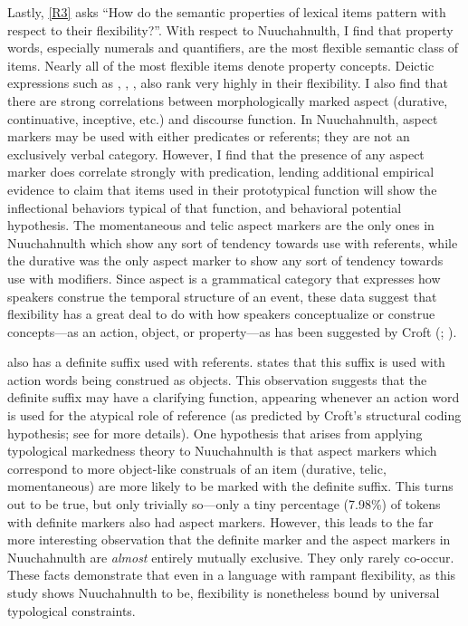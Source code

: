 Lastly, \ref{R3} asks \enquote{How do the semantic properties of lexical items pattern with respect to their flexibility?}. With respect to Nuuchahnulth, I find that property words, especially numerals and quantifiers, are the most flexible semantic class of items. Nearly all of the most flexible items denote property concepts. Deictic expressions such as , , ,  also rank very highly in their flexibility. I also find that there are strong correlations between morphologically marked aspect (durative, continuative, inceptive, etc.) and discourse function. In Nuuchahnulth, aspect markers may be used with either predicates or referents; they are not an exclusively verbal category. However, I find that the presence of any aspect marker does correlate strongly with predication, lending additional empirical evidence to  claim that items used in their prototypical function will show the inflectional behaviors typical of that function, and  behavioral potential hypothesis. The momentaneous and telic aspect markers are the only ones in Nuuchahnulth which show any sort of tendency towards use with referents, while the durative was the only aspect marker to show any sort of tendency towards use with modifiers. Since aspect is a grammatical category that expresses how speakers construe the temporal structure of an event, these data suggest that flexibility has a great deal to do with how speakers conceptualize or construe concepts—as an action, object, or property—as has been suggested by Croft (\citeyear[99]{Croft1991}; \citeyear[104]{Croft2001b}).

 also has a definite suffix  used with referents. \textcite[48]{Nakayama2001} states that this suffix is used with action words being construed as objects. This observation suggests that the definite suffix may have a clarifying function, appearing whenever an action word is used for the atypical role of reference (as predicted by Croft's structural coding hypothesis; see  for more details). One hypothesis that arises from applying typological markedness theory to Nuuchahnulth is that aspect markers which correspond to more object-like construals of an item (durative, telic, momentaneous) are more likely to be marked with the definite suffix. This turns out to be true, but only trivially so—only a tiny percentage (7.98\%) of tokens with definite markers also had aspect markers. However, this leads to the far more interesting observation that the definite marker and the aspect markers in Nuuchahnulth are \emph{almost} entirely mutually exclusive. They only rarely co-occur. These facts demonstrate that even in a language with rampant flexibility, as this study shows Nuuchahnulth to be, flexibility is nonetheless bound by universal typological constraints.

